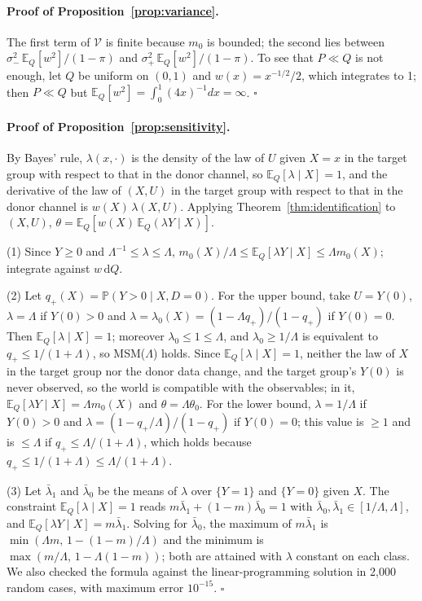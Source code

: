 \documentclass[twoside,11pt]{article}
\newcommand{\E}{\mathbb{E}}
\newcommand{\PP}{\mathbb{P}}
\newcommand{\dd}{\,\mathrm{d}}
\theoremstyle{plain}
\theoremstyle{definition}
\begin{document}
\paragraph{Proof of Proposition~\ref{prop:variance}.}
The first term of $\mathcal V$ is finite because $m_0$ is bounded; the second lies between $\sigma_-^2\,\E_Q[w^2]/(1-\pi)$ and $\sigma_+^2\,\E_Q[w^2]/(1-\pi)$. To see that $P\ll Q$ is not enough, let $Q$ be uniform on $(0,1)$ and $w(x)=x^{-1/2}/2$, which integrates to 1; then $P\ll Q$ but $\E_Q[w^2]=\int_0^1(4x)^{-1}dx=\infty$.
\hfill$\square$


\paragraph{Proof of Proposition~\ref{prop:sensitivity}.}
By Bayes' rule, $\lambda(x,\cdot)$ is the density of the law of $U$ given $X=x$ in the target group with respect to that in the donor channel, so $\E_Q[\lambda\mid X]=1$, and the derivative of the law of $(X,U)$ in the target group with respect to that in the donor channel is $w(X)\,\lambda(X,U)$. Applying Theorem~\ref{thm:identification} to $(X,U)$, $\theta=\E_Q[w(X)\,\E_Q(\lambda Y\mid X)]$.

(1) Since $Y\ge0$ and $\Lambda^{-1}\le\lambda\le\Lambda$, $m_0(X)/\Lambda\le\E_Q[\lambda Y\mid X]\le\Lambda m_0(X)$; integrate against $w\dd Q$.

(2) Let $q_+(X)=\PP(Y>0\mid X,D=0)$. For the upper bound, take $U=Y(0)$, $\lambda=\Lambda$ if $Y(0)>0$ and $\lambda=\lambda_0(X)=(1-\Lambda q_+)/(1-q_+)$ if $Y(0)=0$. Then $\E_Q[\lambda\mid X]=1$; moreover $\lambda_0\le1\le\Lambda$, and $\lambda_0\ge1/\Lambda$ is equivalent to $q_+\le1/(1+\Lambda)$, so MSM($\Lambda$) holds. Since $\E_Q[\lambda\mid X]=1$, neither the law of $X$ in the target group nor the donor data change, and the target group's $Y(0)$ is never observed, so the world is compatible with the observables; in it, $\E_Q[\lambda Y\mid X]=\Lambda m_0(X)$ and $\theta=\Lambda\theta_0$. For the lower bound, $\lambda=1/\Lambda$ if $Y(0)>0$ and $\lambda=(1-q_+/\Lambda)/(1-q_+)$ if $Y(0)=0$; this value is $\ge1$ and is $\le\Lambda$ if $q_+\le\Lambda/(1+\Lambda)$, which holds because $q_+\le1/(1+\Lambda)\le\Lambda/(1+\Lambda)$.

(3) Let $\bar\lambda_1$ and $\bar\lambda_0$ be the means of $\lambda$ over $\{Y=1\}$ and $\{Y=0\}$ given $X$. The constraint $\E_Q[\lambda\mid X]=1$ reads $m\bar\lambda_1+(1-m)\bar\lambda_0=1$ with $\bar\lambda_0,\bar\lambda_1\in[1/\Lambda,\Lambda]$, and $\E_Q[\lambda Y\mid X]=m\bar\lambda_1$. Solving for $\bar\lambda_0$, the maximum of $m\bar\lambda_1$ is $\min(\Lambda m,\,1-(1-m)/\Lambda)$ and the minimum is $\max(m/\Lambda,\,1-\Lambda(1-m))$; both are attained with $\lambda$ constant on each class. We also checked the formula against the linear-programming solution in 2{,}000 random cases, with maximum error $10^{-15}$.
\hfill$\square$
\end{document}
